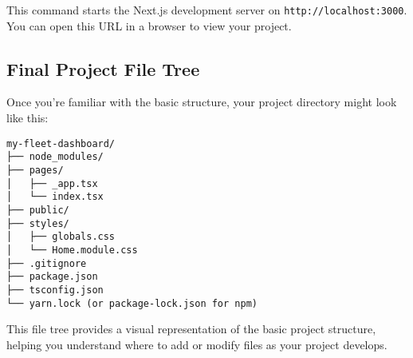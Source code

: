 This command starts the Next.js development server on \texttt{http://localhost:3000}. You can open this URL in a browser to view your project.

\subsection*{Final Project File Tree}
Once you're familiar with the basic structure, your project directory might look like this:

\begin{verbatim}
my-fleet-dashboard/
├── node_modules/
├── pages/
│   ├── _app.tsx
│   └── index.tsx
├── public/
├── styles/
│   ├── globals.css
│   └── Home.module.css
├── .gitignore
├── package.json
├── tsconfig.json
└── yarn.lock (or package-lock.json for npm)
\end{verbatim}

This file tree provides a visual representation of the basic project structure, helping you understand where to add or modify files as your project develops.
